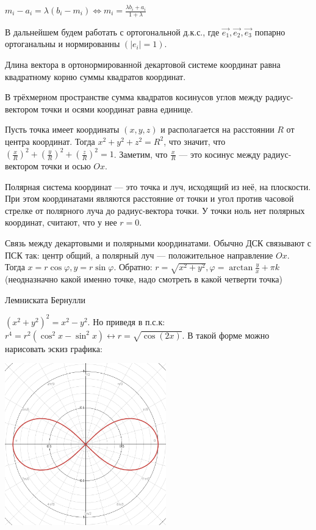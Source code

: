 \documentclass[twoside]{book}
\begin{document}
\(m_i - a_i = \lambda (b_i - m_i) \Leftrightarrow m_i = \frac{\lambda b_i + a_i}{1 + \lambda}\)

В дальнейшем будем работать с ортогональной д.к.с., где \(\vec{e_1},\vec{e_2},\vec{e_3}\) попарно ортоганальны и нормированны \((|e_i|=1)\).

Длина вектора в ортонормированной декартовой системе координат равна квадратному корню суммы квадратов координат.

В трёхмерном пространстве сумма квадратов косинусов углов между радиус-вектором точки и осями координат равна единице.

Пусть точка имеет координаты \((x,y,z)\) и располагается на расстоянии \(R\) от центра координат. Тогда \(x^2 + y^2 +z^2 = R^2\), что значит, что \(\left(\frac{x}{R}\right)^2 + \left(\frac{y}{R}\right)^2 + \left(\frac{z}{R}\right)^2 = 1\). Заметим, что \(\frac{x}{R}\) --- это косинус между радиус-вектором точки и осью \(Ox\).

Полярная система координат --- это точка и луч, исходящий из неё, на плоскости. При этом координатами являются расстояние от точки и угол против часовой стрелке от полярного луча до радиус-вектора точки. У точки ноль нет полярных координат, считают, что у нее \(r=0\).

Связь между декартовыми и полярными координатами. Обычно ДСК связывают с ПСК так: центр общий, а полярный луч --- положительное направление \(Ox\). Тогда \(x=r\cos\varphi, y=r\sin\varphi\). Обратно: \(r=\sqrt{x^2 + y^2}, \varphi=\arctan\frac{y}{x} + \pi k\) (неодназначно какой именно точке, надо смотреть в какой четверти точка)

Лемниската Бернулли

$(x^2+y^2)^2=x^2-y^2$. Но приведя в п.с.к:  \(r^4=r^2(\cos^2x-\sin^2x)\leftrightarrow r=\sqrt{\cos(2x)}\). В такой форме можно нарисовать эскиз графика:
\begin{center}
    \includegraphics[height=7cm]{Images/Chapter_1/1-2-1.png}
\end{center}
\end{document}
